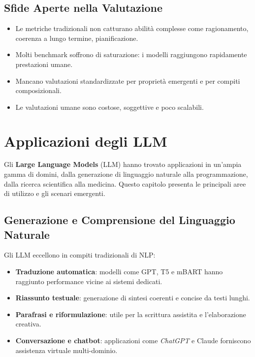 \subsection{Sfide Aperte nella Valutazione}
\begin{itemize}
    \item Le metriche tradizionali non catturano abilità complesse come ragionamento, coerenza a lungo termine, pianificazione.
    \item Molti benchmark soffrono di saturazione: i modelli raggiungono rapidamente prestazioni umane.
    \item Mancano valutazioni standardizzate per proprietà emergenti e per compiti composizionali.
    \item Le valutazioni umane sono costose, soggettive e poco scalabili.
\end{itemize}

\newpage
\section{Applicazioni degli LLM}

Gli \textbf{Large Language Models} (LLM) hanno trovato applicazioni in un'ampia gamma di domini, 
dalla generazione di linguaggio naturale alla programmazione, 
dalla ricerca scientifica alla medicina. 
Questo capitolo presenta le principali aree di utilizzo e gli scenari emergenti.

\subsection{Generazione e Comprensione del Linguaggio Naturale}
Gli LLM eccellono in compiti tradizionali di NLP:
\begin{itemize}
    \item \textbf{Traduzione automatica}: modelli come GPT, T5 e mBART hanno raggiunto 
    performance vicine ai sistemi dedicati.
    \item \textbf{Riassunto testuale}: generazione di sintesi coerenti e concise da testi lunghi.
    \item \textbf{Parafrasi e riformulazione}: utile per la scrittura assistita e l'elaborazione creativa.
    \item \textbf{Conversazione e chatbot}: applicazioni come \textit{ChatGPT} e Claude 
    forniscono assistenza virtuale multi-dominio.
\end{itemize}


